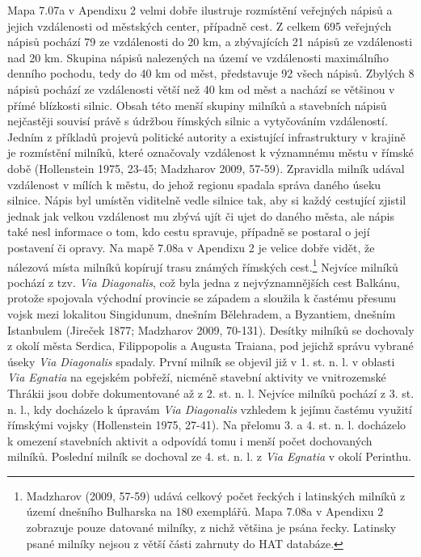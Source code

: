 Mapa 7.07a v Apendixu 2 velmi dobře ilustruje rozmístění veřejných nápisů a jejich vzdálenosti od městských center, případně cest. Z celkem 695 veřejných nápisů pochází 79  ze vzdálenosti do 20 km, a zbývajících 21  nápisů ze vzdálenosti nad 20 km. Skupina nápisů nalezených na území ve vzdálenosti maximálního denního pochodu, tedy do 40 km od měst, představuje 92  všech nápisů. Zbylých 8  nápisů pochází ze vzdálenosti větší než 40 km od měst a nachází se většinou v přímé blízkosti silnic. Obsah této menší skupiny milníků a stavebních nápisů nejčastěji souvisí právě s údržbou římských silnic a vytyčováním vzdáleností.\crlf
Jedním z příkladů projevů politické autority a existující infrastruktury v krajině je rozmístění milníků, které označovaly vzdálenost k významnému městu v římské době (Hollenstein 1975, 23-45; Madzharov 2009, 57-59). Zpravidla milník udával vzdálenost v mílích k městu, do jehož regionu spadala správa daného úseku silnice. Nápis byl umístěn viditelně vedle silnice tak, aby si každý cestující zjistil jednak jak velkou vzdálenost mu zbývá ujít či ujet do daného města, ale nápis také nesl informace o tom, kdo cestu spravuje, případně se postaral o její postavení či opravy. Na mapě 7.08a v Apendixu 2 je velice dobře vidět, že nálezová místa milníků kopírují trasu známých římských cest.\footnote{Madzharov (2009, 57-59) udává celkový počet řeckých i latinských milníků z území dnešního Bulharska na 180 exemplářů. Mapa 7.08a v Apendixu 2 zobrazuje pouze datované milníky, z nichž většina je psána řecky. Latinsky psané milníky nejsou z větší části zahrnuty do HAT databáze.} Nejvíce milníků pochází z tzv. {\em Via Diagonalis}, což byla jedna z nejvýznamnějších cest Balkánu, protože spojovala východní provincie se západem a sloužila k častému přesunu vojsk mezi lokalitou Singidunum, dnešním Bělehradem, a Byzantiem, dnešním Istanbulem (Jireček 1877; Madzharov 2009, 70-131). Desítky milníků se dochovaly z okolí města Serdica, Filippopolis a Augusta Traiana, pod jejichž správu vybrané úseky {\em Via Diagonalis} spadaly. První milník se objevil již v 1. st. n. l. v oblasti {\em Via Egnatia} na egejském pobřeží, nicméně stavební aktivity ve vnitrozemské Thrákii jsou dobře dokumentované až z 2. st. n. l. Nejvíce milníků pochází z 3. st. n. l., kdy docházelo k úpravám {\em Via Diagonalis} vzhledem k jejímu častému využití římskými vojsky (Hollenstein 1975, 27-41). Na přelomu 3. a 4. st. n. l. docházelo k omezení stavebních aktivit a odpovídá tomu i menší počet dochovaných milníků. Poslední milník se dochoval ze 4. st. n. l. z {\em Via Egnatia} v okolí Perinthu.

